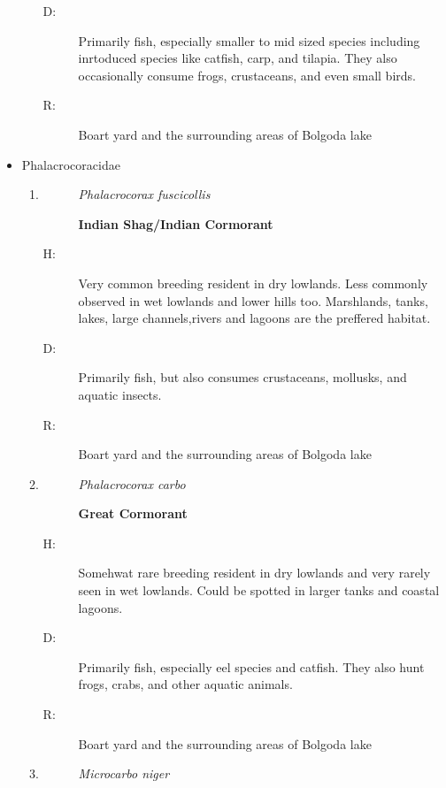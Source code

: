 \begin{itemize}
\begin{enumerate}
\begin{description}
\item[D: ]%
Primarily fish, especially smaller to mid sized species including inrtoduced species like catfish, carp, and tilapia. They also occasionally consume frogs, crustaceans, and even small birds.%
\item[R: ]%
Boart yard and the surrounding areas of Bolgoda lake%
\end{description}%
\end{enumerate}%
\item%
Phalacrocoracidae%
\begin{enumerate}%
\item%
\begin{description}%
\item[]%
\textit{Phalacrocorax fuscicollis}%
\item[]%
\textbf{Indian Shag/Indian Cormorant}%
\end{description}%
\begin{description}%
\item[H: ]%
Very common breeding resident in dry lowlands. Less commonly observed in wet lowlands and lower hills too. Marshlands, tanks, lakes, large channels,rivers and lagoons are the preffered habitat.%
\item[D: ]%
Primarily fish, but also consumes crustaceans, mollusks, and aquatic insects.%
\item[R: ]%
Boart yard and the surrounding areas of Bolgoda lake%
\end{description}%
\item%
\begin{description}%
\item[]%
\textit{Phalacrocorax carbo}%
\item[]%
\textbf{Great Cormorant}%
\end{description}%
\begin{description}%
\item[H: ]%
Somehwat rare breeding resident in dry lowlands and very rarely seen in wet lowlands. Could be spotted in larger tanks and coastal lagoons.%
\item[D: ]%
Primarily fish, especially eel species and catfish. They also hunt frogs, crabs, and other aquatic animals.%
\item[R: ]%
Boart yard and the surrounding areas of Bolgoda lake%
\end{description}%
\item%
\begin{description}%
\item[]%
\textit{Microcarbo niger}%

\end{description}
\end{enumerate}
\end{itemize}
